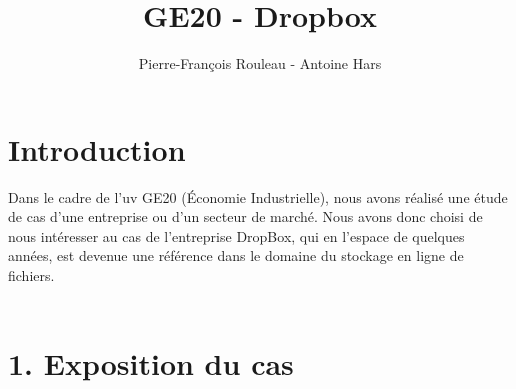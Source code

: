 \documentclass[a4paper, 10pt]{article}
\title{GE20 - Dropbox}
\author{Pierre-François Rouleau - Antoine Hars}
\begin{document}
\maketitle

\section*{Introduction}
Dans le cadre de l'uv GE20 (Économie Industrielle),
nous avons réalisé une étude de cas d'une entreprise ou d'un secteur de marché.
Nous avons donc choisi de nous intéresser au cas de l'entreprise DropBox,
qui en l'espace de quelques années, est devenue une référence dans le domaine du stockage en ligne de fichiers.\\ \\

\section*{1. Exposition du cas}
\end{document}
